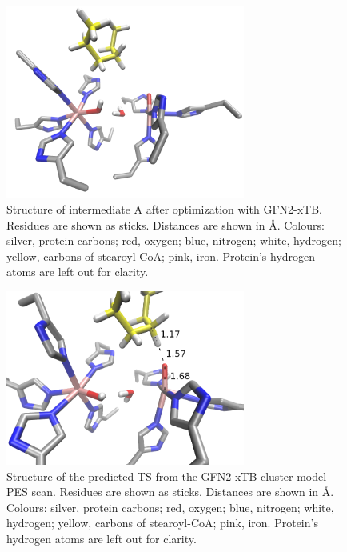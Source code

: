 \begin{figure}
    \centering
    \includegraphics[width=0.7\textwidth]{Figures/intA_xtb.png}
    \caption{Structure of intermediate A after optimization with GFN2-xTB. Residues are shown as sticks. Distances are shown in Å. Colours: silver, protein carbons; red, oxygen; blue, nitrogen; white, hydrogen; yellow, carbons of stearoyl-CoA; pink, iron. Protein's hydrogen atoms are left out for clarity.}
    \label{fig:xtb_intA}
\end{figure}

\begin{figure}
    \centering
    \includegraphics[width=0.7\textwidth]{Figures/TS_xtb.png}
    \caption{Structure of the predicted TS from the GFN2-xTB cluster model PES scan. Residues are shown as sticks. Distances are shown in Å. Colours: silver, protein carbons; red, oxygen; blue, nitrogen; white, hydrogen; yellow, carbons of stearoyl-CoA; pink, iron. Protein's hydrogen atoms are left out for clarity.}
    \label{fig:xtb_TS}
\end{figure}

